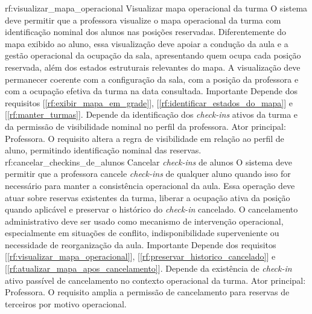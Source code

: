 \reqfuncfull
{rf:visualizar_mapa_operacional}
{Visualizar mapa operacional da turma}
{O sistema deve permitir que a professora visualize o mapa operacional da turma com identificação nominal dos alunos nas posições reservadas. Diferentemente do mapa exibido ao aluno, essa visualização deve apoiar a condução da aula e a gestão operacional da ocupação da sala, apresentando quem ocupa cada posição reservada, além dos estados estruturais relevantes do mapa. A visualização deve permanecer coerente com a configuração da sala, com a posição da professora e com a ocupação efetiva da turma na data consultada.}
{Importante}
{Depende dos requisitos [\ref{rf:exibir_mapa_em_grade}], [\ref{rf:identificar_estados_do_mapa}] e [\ref{rf:manter_turmas}]. Depende da identificação dos \textit{check-ins} ativos da turma e da permissão de visibilidade nominal no perfil da professora.}
{Ator principal: Professora. O requisito altera a regra de visibilidade em relação ao perfil de aluno, permitindo identificação nominal das reservas.}
\reqfuncfull
{rf:cancelar_checkins_de_alunos}
{Cancelar \textit{check-ins} de alunos}
{O sistema deve permitir que a professora cancele \textit{check-ins} de qualquer aluno quando isso for necessário para manter a consistência operacional da aula. Essa operação deve atuar sobre reservas existentes da turma, liberar a ocupação ativa da posição quando aplicável e preservar o histórico do \textit{check-in} cancelado. O cancelamento administrativo deve ser usado como mecanismo de intervenção operacional, especialmente em situações de conflito, indisponibilidade superveniente ou necessidade de reorganização da aula.}
{Importante}
{Depende dos requisitos [\ref{rf:visualizar_mapa_operacional}], [\ref{rf:preservar_historico_cancelado}] e [\ref{rf:atualizar_mapa_apos_cancelamento}]. Depende da existência de \textit{check-in} ativo passível de cancelamento no contexto operacional da turma.}
{Ator principal: Professora. O requisito amplia a permissão de cancelamento para reservas de terceiros por motivo operacional.}


